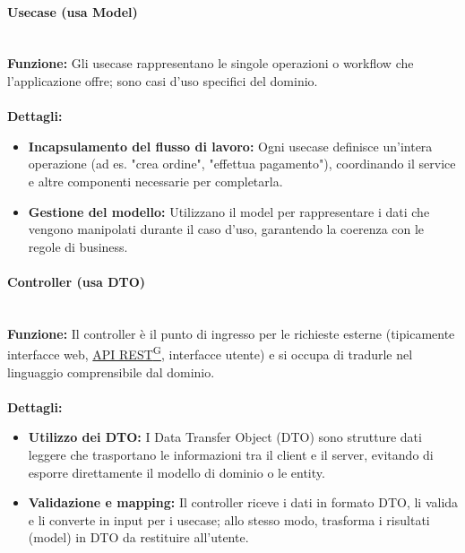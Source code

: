 \paragraph{Usecase (usa Model)}
\mbox{}\\
\textbf{Funzione:} Gli usecase rappresentano le singole operazioni o workflow che l’applicazione offre; sono casi d’uso specifici del dominio. \\
\mbox{}\\
\textbf{Dettagli:}
\begin{itemize}
  \item \textbf{Incapsulamento del flusso di lavoro:} Ogni usecase definisce un’intera operazione (ad es. "crea ordine", "effettua pagamento"), coordinando il service e altre componenti necessarie per completarla.
  \item \textbf{Gestione del modello:} Utilizzano il model per rappresentare i dati che vengono manipolati durante il caso d’uso, garantendo la coerenza con le regole di business.
\end{itemize}

\paragraph{Controller (usa DTO)}
\mbox{}\\
\textbf{Funzione:} Il controller è il punto di ingresso per le richieste esterne (tipicamente interfacce web, \href{https://code7crusaders.github.io/docs/\href{https://code7crusaders.github.io/docs/PB/documentazione_interna/glossario.html#pb-product-baseline}{PB\textsuperscript{G}}/documentazione_interna/glossario.html#api-rest-representational-state-transfer}{API REST\textsuperscript{G}}, interfacce utente) e si occupa di tradurle nel linguaggio comprensibile dal dominio. \\
\mbox{}\\
\textbf{Dettagli:}
\begin{itemize}
  \item \textbf{Utilizzo dei DTO:} I Data Transfer Object (DTO) sono strutture dati leggere che trasportano le informazioni tra il client e il server, evitando di esporre direttamente il modello di dominio o le entity.
  \item \textbf{Validazione e mapping:} Il controller riceve i dati in formato DTO, li valida e li converte in input per i usecase; allo stesso modo, trasforma i risultati (model) in DTO da restituire all’utente.
\end{itemize}

